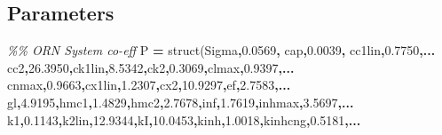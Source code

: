 \documentclass[
]{article}
\newenvironment{Shaded}{\begin{snugshade}}{\end{snugshade}}
\newcommand{\CommentTok}[1]{\textcolor[rgb]{0.56,0.35,0.01}{\textit{#1}}}
\newcommand{\FloatTok}[1]{\textcolor[rgb]{0.00,0.00,0.81}{#1}}
\newcommand{\FunctionTok}[1]{\textcolor[rgb]{0.00,0.00,0.00}{#1}}
\newcommand{\NormalTok}[1]{#1}
\newcommand{\OperatorTok}[1]{\textcolor[rgb]{0.81,0.36,0.00}{\textbf{#1}}}
\newcommand{\StringTok}[1]{\textcolor[rgb]{0.31,0.60,0.02}{#1}}
\begin{document}
\hypertarget{parameters}{%
\subsection*{Parameters}\label{parameters}}

\begin{Shaded}
\begin{Highlighting}[]
\CommentTok{\%\% ORN System co{-}eff}
\NormalTok{P }\OperatorTok{=} \FunctionTok{struct}\NormalTok{(}\StringTok{\textquotesingle{}Sigma\textquotesingle{}}\OperatorTok{,}\FloatTok{0.0569}\OperatorTok{,} \StringTok{\textquotesingle{}cap\textquotesingle{}}\OperatorTok{,}\FloatTok{0.0039}\OperatorTok{,} \StringTok{\textquotesingle{}cc1lin\textquotesingle{}}\OperatorTok{,}\FloatTok{0.7750}\OperatorTok{,...}
        \StringTok{\textquotesingle{}cc2\textquotesingle{}}\OperatorTok{,}\FloatTok{26.3950}\OperatorTok{,}\StringTok{\textquotesingle{}ck1lin\textquotesingle{}}\OperatorTok{,}\FloatTok{8.5342}\OperatorTok{,}\StringTok{\textquotesingle{}ck2\textquotesingle{}}\OperatorTok{,}\FloatTok{0.3069}\OperatorTok{,}\StringTok{\textquotesingle{}clmax\textquotesingle{}}\OperatorTok{,}\FloatTok{0.9397}\OperatorTok{,...}
        \StringTok{\textquotesingle{}cnmax\textquotesingle{}}\OperatorTok{,}\FloatTok{0.9663}\OperatorTok{,}\StringTok{\textquotesingle{}cx1lin\textquotesingle{}}\OperatorTok{,}\FloatTok{1.2307}\OperatorTok{,}\StringTok{\textquotesingle{}cx2\textquotesingle{}}\OperatorTok{,}\FloatTok{10.9297}\OperatorTok{,}\StringTok{\textquotesingle{}ef\textquotesingle{}}\OperatorTok{,}\FloatTok{2.7583}\OperatorTok{,...}
        \StringTok{\textquotesingle{}gl\textquotesingle{}}\OperatorTok{,}\FloatTok{4.9195}\OperatorTok{,}\StringTok{\textquotesingle{}hmc1\textquotesingle{}}\OperatorTok{,}\FloatTok{1.4829}\OperatorTok{,}\StringTok{\textquotesingle{}hmc2\textquotesingle{}}\OperatorTok{,}\FloatTok{2.7678}\OperatorTok{,}\StringTok{\textquotesingle{}inf\textquotesingle{}}\OperatorTok{,}\FloatTok{1.7619}\OperatorTok{,}\StringTok{\textquotesingle{}inhmax\textquotesingle{}}\OperatorTok{,}\FloatTok{3.5697}\OperatorTok{,...}
        \StringTok{\textquotesingle{}k1\textquotesingle{}}\OperatorTok{,}\FloatTok{0.1143}\OperatorTok{,}\StringTok{\textquotesingle{}k2lin\textquotesingle{}}\OperatorTok{,}\FloatTok{12.9344}\OperatorTok{,}\StringTok{\textquotesingle{}kI\textquotesingle{}}\OperatorTok{,}\FloatTok{10.0453}\OperatorTok{,}\StringTok{\textquotesingle{}kinh\textquotesingle{}}\OperatorTok{,}\FloatTok{1.0018}\OperatorTok{,}\StringTok{\textquotesingle{}kinhcng\textquotesingle{}}\OperatorTok{,}\FloatTok{0.5181}\OperatorTok{,...}

\end{Highlighting}
\end{Shaded}
\end{document}
